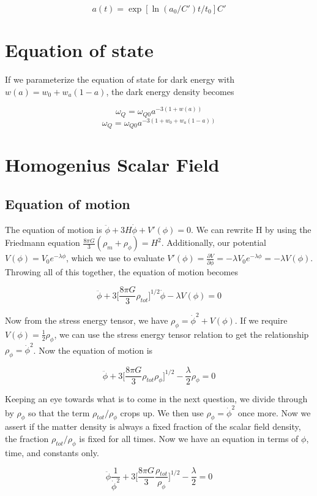 \documentclass[12pt]{article}
\begin{document}
$$a(t) = \exp[\ln (a_0/C') t/ t_{0}]  C'$$

\section{Equation of state}
If we parameterize the equation of state for dark energy with $w(a) = w_0 + w_{a}(1 - a)$, the dark energy density becomes

$$ \omega_{Q} = \omega_{Q 0}a^{-3(1 + w(a))}$$
$$ \omega_{Q} = \omega_{Q 0}a^{-3(1 + w_0 + w_{a}(1 - a))}$$

\section{Homogenius Scalar Field}
\subsection{Equation of motion}
The equation of motion is $\ddot{\phi} + 3H\dot{\phi} + V'(\phi) = 0$. We can rewrite H by using the Friedmann equation $\frac{8 \pi G}{3} (\rho_m + \rho_{\phi}) = H^2$.  Additionally, our potential $V(\phi) = V_{0}e^{-\lambda \phi}$, which we use to evaluate $V'(\phi) = \frac{\partial V}{\partial \phi} = -\lambda V_{0}e^{-\lambda \phi} = -\lambda V(\phi)$. Throwing all of this together, the equation of motion becomes

$$\ddot{\phi} + 3\Big[ \frac{8 \pi G}{3} \rho_{tot} \Big]^{1/2}\dot{\phi} - \lambda V(\phi) = 0$$

Now from the stress energy tensor, we have $\rho_{\phi} = \dot{\phi}^2 + V(\phi)$. If we require $V(\phi) = \frac{1}{2} \rho_{\phi}$, we can use the stress energy tensor relation to get the relationship $\rho_{\phi} = \dot{\phi}^2$. Now the equation of motion is 

$$\ddot{\phi} + 3\Big[ \frac{8 \pi G}{3} \rho_{tot} \rho_{\phi} \Big]^{1/2} - \frac{\lambda}{2} \rho_{\phi} = 0$$

Keeping an eye towards what is to come in the next question, we divide through by $\rho_{\phi} $ so that the term $\rho_{tot}/ \rho_{\phi} $ crops up. We then use $\rho_{\phi} = \dot{\phi}^2$ once more. Now we assert if the matter density is always a fixed fraction of the scalar field density, the fraction $\rho_{tot}/ \rho_{\phi}$ is fixed for all times. Now we have an equation in terms of $\phi$, time, and constants only.

 $$\ddot{\phi} \frac{1}{\dot{\phi}^2} + 3\Big[ \frac{8 \pi G}{3} \frac{\rho_{tot}}{ \rho_{\phi}} \Big]^{1/2} - \frac{\lambda}{2} = 0$$
 
\end{document}
